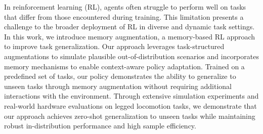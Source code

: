 In reinforcement learning (RL), agents often struggle to perform well on tasks that differ from those encountered during training. 
This limitation presents a challenge to the broader deployment of RL in diverse and dynamic task settings. 
In this work, we introduce memory augmentation, a memory-based RL approach to improve task generalization. 
Our approach leverages task-structured augmentations to simulate plausible out-of-distribution scenarios and incorporates memory mechanisms to enable context-aware policy adaptation. 
Trained on a predefined set of tasks, our policy demonstrates the ability to generalize to unseen tasks through memory augmentation without requiring additional interactions with the environment. 
Through extensive simulation experiments and real-world hardware evaluations on legged locomotion tasks, we demonstrate that our approach achieves zero-shot generalization to unseen tasks while maintaining robust in-distribution performance and high sample efficiency.